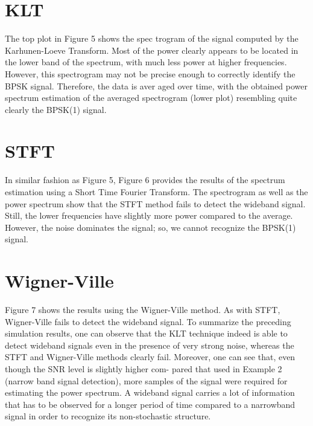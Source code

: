 \documentclass[12pt]{report}
\begin{document}
\section*{KLT}
The top plot in Figure 5 shows the spec
trogram of the signal computed by the
Karhunen-Loeve Transform. Most of
the power clearly appears to be located
in the lower band of the spectrum, with
much less power at higher frequencies.
However, this spectrogram may not be
precise enough to correctly identify the
BPSK signal. Therefore, the data is aver
aged over time, with the obtained power
spectrum estimation of the averaged
spectrogram (lower plot) resembling
quite clearly the BPSK(1) signal.
\section*{STFT}
In similar fashion as Figure 5, Figure
6 provides the results of the spectrum
estimation using a Short Time Fourier Transform. The spectrogram as well as the power spectrum show that the STFT method fails to detect the wideband signal.
Still, the lower frequencies have slightly more power compared to the average. However, the noise dominates the signal; so, we cannot recognize the
BPSK(1) signal.
\section*{Wigner-Ville}
Figure 7 shows the results using the Wigner-Ville method. As with STFT, Wigner-Ville fails to detect the wideband signal.
To summarize the preceding simulation results, one can observe that the KLT technique indeed is able to detect wideband signals even in the presence of very strong noise, whereas the STFT and Wigner-Ville methods clearly fail.
Moreover, one can see that, even though
the SNR level is slightly higher com-
pared that used in Example 2 (narrow
band signal detection), more samples of
the signal were required for estimating
the power spectrum. A wideband signal
carries a lot of information that has to
be observed for a longer period of time
compared to a narrowband signal in
order to recognize its non-stochastic
structure.
\end{document}
